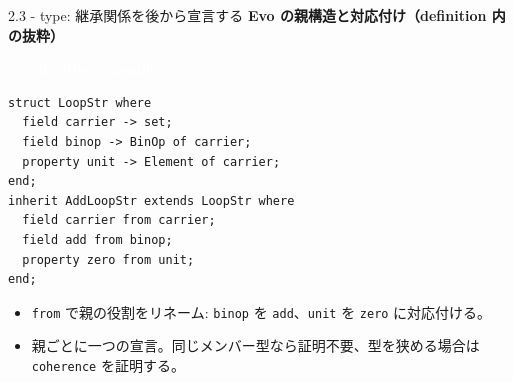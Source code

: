 \documentclass[dvipdfmx,aspectratio=169,11pt]{beamer}
\newcommand{\statusbadge}[2]{\colorbox{#1}{\textcolor{white}{\strut\scriptsize\sffamily\bfseries #2}}}
\newcommand{\badgeSpec}{\statusbadge{green!35!black}{specification example}}
\begin{document}
\begin{frame}[fragile,t]{2.3 - type: 継承関係を後から宣言する}
\smallskip
\textbf{Evo の親構造と対応付け（definition 内の抜粋）}~\badgeSpec
\begin{lstlisting}[language={mizar},basicstyle=\ttfamily\footnotesize]
struct LoopStr where
  field carrier -> set;
  field binop -> BinOp of carrier;
  property unit -> Element of carrier;
end;
inherit AddLoopStr extends LoopStr where
  field carrier from carrier;
  field add from binop;
  property zero from unit;
end;
\end{lstlisting}
\begin{itemize}
\setlength{\itemsep}{1pt}
\setlength{\parsep}{0pt}
\setlength{\parskip}{0pt}
\item \texttt{from} で親の役割をリネーム: \texttt{binop} を \texttt{add}、\texttt{unit} を \texttt{zero} に対応付ける。
\item 親ごとに一つの宣言。同じメンバー型なら証明不要、型を狭める場合は \texttt{coherence} を証明する。
\end{itemize}
\end{frame}
\end{document}
